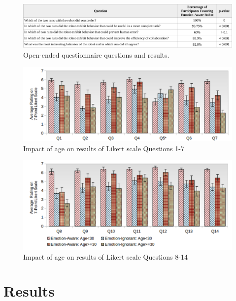 \documentclass[12pt]{report}
\begin{document}
\begin{figure}[tbh]
\centering
\includegraphics[width=1\textwidth]{figure/table2-croped.pdf}
\caption{Open-ended questionnaire questions and results.}
\label{fig:Open-Ended-Table}
\label{fig:14Questions}
\vspace*{-5mm}
\end{figure}

\begin{figure}[tbh]
\centering
\includegraphics[width=1\textwidth]{figure/AgeComparison1.pdf}
\caption{Impact of age on results of Likert scale Questions 1-7}
\end{figure}

\begin{figure}[tbh]
\centering
\includegraphics[width=1\textwidth]{figure/AgeComparison2.pdf}
\caption{Impact of age on results of Likert scale Questions 8-14}
\end{figure}

\vspace*{-3mm}
\section{Results}
\end{document}
